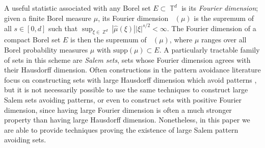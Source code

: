 \documentclass[dvipsnames,letterpaper,12pt]{article}
\numberwithin{equation}{section}
\DeclareMathOperator{\fordim}{\dim_{\mathbb{F}}}
\DeclareMathOperator{\ZZ}{\mathbb{Z}}
\DeclareMathOperator{\TT}{\mathbb{T}}
\numberwithin{theorem}{section}
\begin{document}
A useful statistic associated with any Borel set $E \subset \TT^d$ is its \emph{Fourier dimension}; given a finite Borel measure $\mu$, its Fourier dimension $\fordim(\mu)$ is the supremum of all $s \in [0,d]$ such that $\sup_{\xi \in \ZZ^d} |\widehat{\mu}(\xi)| |\xi|^{s/2} < \infty$. The Fourier dimension of a compact Borel set $E$ is then the supremum of $\fordim(\mu)$, where $\mu$ ranges over all Borel probability measures $\mu$ with $\text{supp}(\mu) \subset E$. A particularly tractable family of sets in this scheme are \emph{Salem sets}, sets whose Fourier dimension agrees with their Hausdorff dimension. Often constructions in the pattern avoidance literature focus on constructing sets with large Hausdorff dimension which avoid patterns \cite{OurPaper,PramanikFraser,Mathe}, but it is not necessarily possible to use the same techniques to construct large Salem sets avoiding patterns, or even to construct sets with positive Fourier dimension, since having large Fourier dimension is often a much stronger property than having large Hausdorff dimension. Nonetheless, in this paper we are able to provide techniques proving the existence of large Salem pattern avoiding sets.
\end{document}

